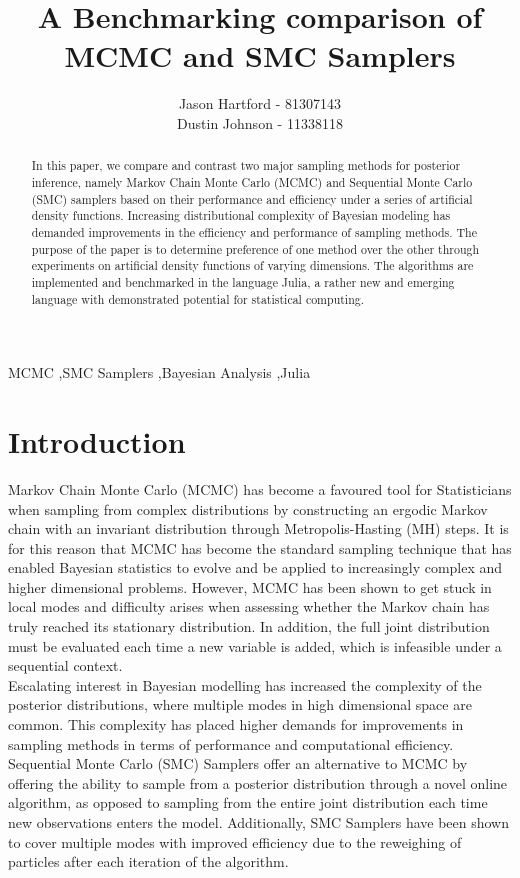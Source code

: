 \documentclass[12pt]{elsarticle}
\begin{document}
	
\begin{frontmatter}
\title{A Benchmarking comparison of MCMC and SMC Samplers}
\author{Jason Hartford - 81307143 \\ Dustin Johnson - 11338118}

\begin{abstract}
In this paper, we compare and contrast two major sampling methods for posterior inference, namely Markov Chain Monte Carlo (MCMC) and Sequential Monte Carlo (SMC) samplers based on their performance and efficiency under a series of artificial density functions. Increasing distributional complexity of Bayesian modeling has demanded improvements in the efficiency and performance of sampling methods.  The purpose of the paper is to determine preference of one method over the other through experiments on artificial density functions of varying dimensions. The algorithms are implemented and benchmarked in the language Julia, a rather new and emerging language with demonstrated potential for statistical computing.
\end{abstract}

\begin{keyword}
MCMC \sep SMC Samplers \sep Bayesian Analysis \sep Julia
\end{keyword}

\end{frontmatter}



\section*{Introduction}
Markov Chain Monte Carlo (MCMC) has become a favoured tool for Statisticians when sampling from complex distributions by constructing an ergodic Markov chain with an invariant distribution through Metropolis-Hasting (MH) steps. It is for this reason that MCMC has become the standard sampling technique that has enabled Bayesian statistics to evolve and be applied to increasingly complex and higher dimensional problems. However, MCMC has been shown to get stuck in local modes and difficulty arises when assessing whether the Markov chain has truly reached its stationary distribution. In addition, the full joint distribution must be evaluated each time a new variable is added, which is infeasible under a sequential context. \\

Escalating interest in Bayesian modelling has increased the complexity of the posterior distributions, where multiple modes in high dimensional space are common. This complexity has placed higher demands for improvements in sampling methods in terms of performance and computational efficiency. Sequential Monte Carlo (SMC) Samplers \cite{DelMoral2005} offer an alternative to MCMC by offering the ability to sample from a posterior distribution through a novel online algorithm, as opposed to sampling from the entire joint distribution each time new observations enters the model.  Additionally, SMC Samplers have been shown to cover multiple modes with improved efficiency due to the reweighing of particles after each iteration of the algorithm. \\
\end{document}
